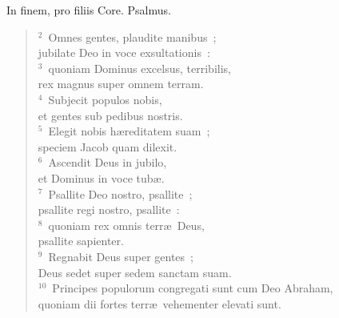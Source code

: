 \bchapter
\lettrine[lines=3,image=true,loversize=0.05,lraise=-0.03]{I}{}n finem, pro filiis Core. Psalmus.
\begin{flushleft}\begin{verse}\vspace{6pt}${}^{2}$~Omnes gentes, plaudite manibus~;\\ jubilate Deo in voce exsultationis~:\\
${}^{3}$~quoniam Dominus excelsus, terribilis,\\ rex magnus super omnem terram.\\
${}^{4}$~Subjecit populos nobis,\\ et gentes sub pedibus nostris.\\
${}^{5}$~Elegit nobis h\ae reditatem suam~;\\ speciem Jacob quam dilexit.\\
${}^{6}$~Ascendit Deus in jubilo,\\ et Dominus in voce tub\ae .\\
${}^{7}$~Psallite Deo nostro, psallite~;\\ psallite regi nostro, psallite~:\\
${}^{8}$~quoniam rex omnis terr\ae\ Deus,\\ psallite sapienter.\\
${}^{9}$~Regnabit Deus super gentes~;\\ Deus sedet super sedem sanctam suam.\\
${}^{10}$~Principes populorum congregati sunt cum Deo Abraham,\\ quoniam dii fortes terr\ae\ vehementer elevati sunt.\end{verse}\end{flushleft}




